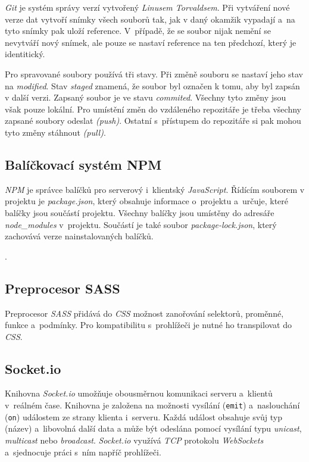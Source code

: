 \documentclass[a4paper,12pt]{article}
\def\code#1{\texttt{#1}}
\begin{document}
\textit{Git} je systém správy verzí vytvořený \textit{Linusem Torvaldsem}. Při vytváření nové verze dat vytvoří snímky všech souborů tak, jak v daný okamžik vypadají a~na tyto snímky pak uloží reference. V~případě, že se soubor nijak nemění se nevytváří nový snímek, ale pouze se nastaví reference na ten předchozí, který je identitický.~\cite{git}

Pro spravované soubory používá tři stavy. Při změně souboru se nastaví jeho stav na \textit{modified}. Stav \textit{staged} znamená, že soubor byl označen k tomu, aby byl zapsán v další verzi. Zapsaný soubor je ve stavu \textit{commited}. Všechny tyto změny jsou však pouze lokální. Pro umístění změn do vzdáleného repozitáře je třeba všechny zapsané soubory odeslat \textit{(push)}. Ostatní s~přístupem do repozitáře si pak mohou tyto změny stáhnout \textit{(pull)}.~\cite{git}

\subsection{Balíčkovací systém NPM}

\textit{NPM} je správce balíčků pro serverový i~klientský \textit{JavaScript}. Řídícím souborem v projektu je \textit{package.json}, který obsahuje informace o~projektu a~určuje, které balíčky jsou součástí projektu.  Všechny balíčky jsou umístěny do adresáře \textit{node\_modules} v~projektu. Součástí je také soubor \textit{package-lock.json}, který zachovává verze nainstalovaných balíčků.~\cite{nodebook}

.

\vspace*{-1.5cm}
\subsection{Preprocesor SASS}

Preprocesor \textit{SASS} přidává do \textit{CSS} možnost zanořování selektorů, proměnné, funkce a~podmínky. Pro kompatibilitu s~prohlížeči je nutné ho transpilovat do \textit{CSS}.~\cite{sass}

\subsection{Socket.io}

Knihovna \textit{Socket.io} umožňuje obousměrnou komunikaci serveru a~klientů v~reálném čase. Knihovna je založena na možnosti vysílání (\code{emit}) a~naslouchání (\code{on}) událostem ze strany klienta i~serveru. Každá událost obsahuje svůj typ (název) a~libovolná další data a může být odeslána pomocí vysílání typu \textit{unicast}, \textit{multicast} nebo \textit{broadcast}. \textit{Socket.io} využívá \textit{TCP} protokolu \textit{WebSockets} a~sjednocuje práci s~ním napříč prohlížeči.~\cite{sockets}
\end{document}
